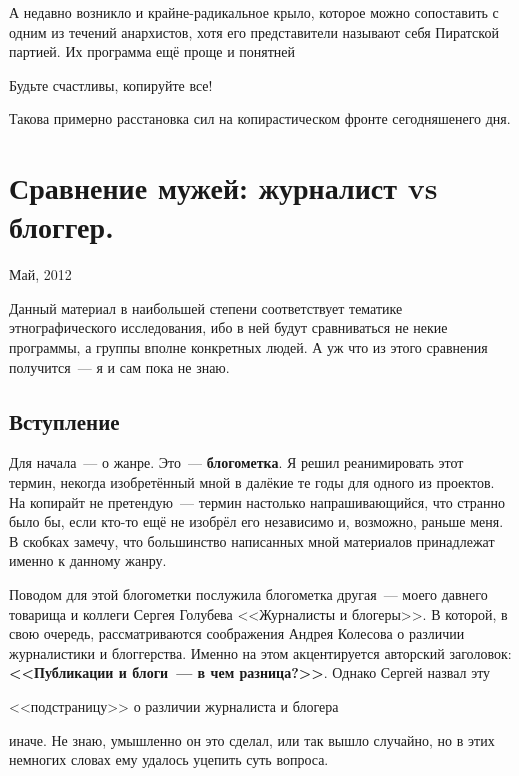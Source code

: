 А недавно возникло и крайне-радикальное крыло, которое можно сопоставить с одним из течений анархистов, хотя его представители называют себя Пиратской партией. Их программа ещё проще и понятней


\begin{shadequote}{}Будьте счастливы, копируйте все!\end{shadequote}

Такова примерно расстановка сил на копирастическом фронте сегодняшенего дня.

\section{Сравнение мужей: журналист vs блоггер.}
\begin{timeline}Май, 2012\end{timeline}

Данный материал в наибольшей степени соответствует  тематике этнографического исследования, ибо в ней будут сравниваться не некие программы, а группы вполне конкретных людей. А уж что из этого сравнения получится~--- я и сам пока не знаю.

\subsection{Вступление}
Для начала~--- о жанре. Это~--- \textbf{блогометка}. Я решил реанимировать этот термин, некогда изобретённый мной в далёкие те годы для одного из проектов. На копирайт не претендую~--- термин настолько напрашивающийся, что странно было бы, если кто-то ещё не изобрёл его независимо и, возможно, раньше меня. В скобках замечу, что большинство написанных мной материалов принадлежат именно к данному жанру. 

Поводом для этой блогометки послужила блогометка другая~--- моего давнего товарища и коллеги Сергея Голубева <<Журналисты и блогеры>>. В которой, в свою очередь, рассматриваются соображения Андрея Колесова о различии журналистики и блоггерства. Именно на этом акцентируется авторский заголовок: \textbf{<<Публикации и блоги~--- в чем разница?>>}. Однако Сергей назвал эту


\begin{shadequote}{}<<подстраницу>> о различии журналиста и блогера\end{shadequote}

иначе. Не знаю, умышленно он это сделал, или так вышло случайно, но в этих немногих словах ему удалось уцепить суть вопроса.

